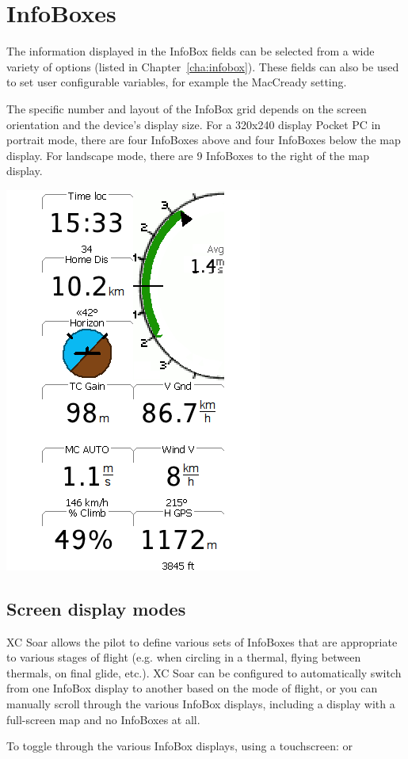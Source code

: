 \section{InfoBoxes}

The information displayed in the InfoBox fields can be selected from a
wide variety of options (listed in Chapter~\ref{cha:infobox}). These
fields can also be used to set user configurable variables, for example
the MacCready setting.

The specific number and layout of the InfoBox grid depends on the
screen orientation and the device's display size.  For a 320x240 display
Pocket PC in portrait mode, there are four InfoBoxes above and four
InfoBoxes below the map display. For landscape mode, there are 9
InfoBoxes to the right of the map display.

\begin{center}
\includegraphics[angle=0,width=0.35\linewidth,keepaspectratio='true']{figures/infoboxes.png}
\end{center}

\subsection*{Screen display modes}

XC Soar allows the pilot to define various sets of InfoBoxes that are appropriate to various stages of flight (e.g. when circling in a thermal, flying between thermals, on final glide, etc.). XC Soar can be configured to automatically switch from one InfoBox display to another based on the mode of flight, or you can manually scroll through the various InfoBox displays, including a display with a full-screen map and no InfoBoxes at all.

To toggle through the various InfoBox displays, using a touchscreen:
or


